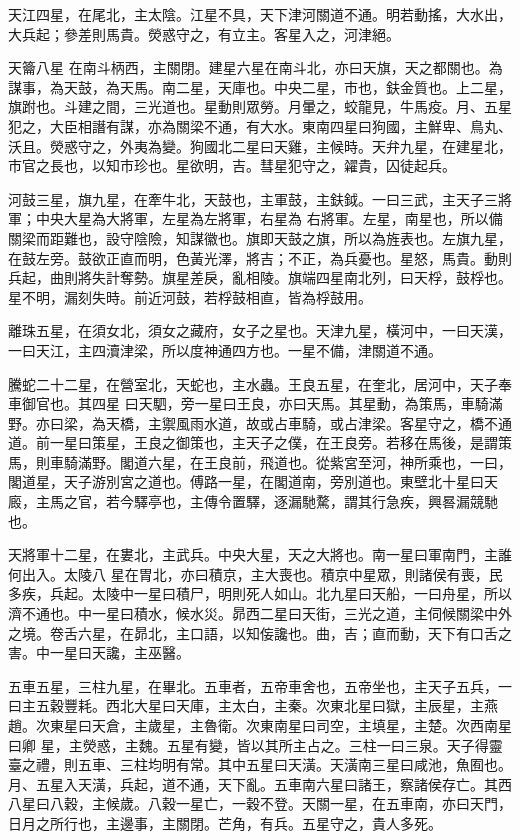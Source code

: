 \begin{pinyinscope}
{{ 天江四星，在尾北，主太陰。江星不具，天下津河關道不通。明若動搖，大水出，大兵起；參差則馬貴。熒惑守之，有立主。客星入之，河津絕。



 天籥八星
 在南斗柄西，主關閉。建星六星在南斗北，亦曰天旗，天之都關也。為謀事，為天鼓，為天馬。南二星，天庫也。中央二星，市也，鈇金質也。上二星，旗跗也。斗建之間，三光道也。星動則眾勞。月暈之，蛟龍見，牛馬疫。月、五星犯之，大臣相譖有謀，亦為關梁不通，有大水。東南四星曰狗國，主鮮卑、鳥丸、沃且。熒惑守之，外夷為變。狗國北二星曰天雞，主候時。天弁九星，在建星北，市官之長也，以知市珍也。星欲明，吉。彗星犯守之，糴貴，囚徒起兵。



 河鼓三星，旗九星，在牽牛北，天鼓也，主軍鼓，主鈇鉞。一曰三武，主天子三將軍；中央大星為大將軍，左星為左將軍，右星為
 右將軍。左星，南星也，所以備關梁而距難也，設守陰險，知謀徽也。旗即天鼓之旗，所以為旌表也。左旗九星，在鼓左旁。鼓欲正直而明，色黃光澤，將吉；不正，為兵憂也。星怒，馬貴。動則兵起，曲則將失計奪勢。旗星差戾，亂相陵。旗端四星南北列，曰天桴，鼓桴也。星不明，漏刻失時。前近河鼓，若桴鼓相直，皆為桴鼓用。



 離珠五星，在須女北，須女之藏府，女子之星也。天津九星，橫河中，一曰天漢，一曰天江，主四瀆津梁，所以度神通四方也。一星不備，津關道不通。



 騰蛇二十二星，在營室北，天蛇也，主水蟲。王良五星，在奎北，居河中，天子奉車御官也。其四星
 曰天駟，旁一星曰王良，亦曰天馬。其星動，為策馬，車騎滿野。亦曰梁，為天橋，主禦風雨水道，故或占車騎，或占津梁。客星守之，橋不通道。前一星曰策星，王良之御策也，主天子之僕，在王良旁。若移在馬後，是謂策馬，則車騎滿野。閣道六星，在王良前，飛道也。從紫宮至河，神所乘也，一曰，閣道星，天子游別宮之道也。傅路一星，在閣道南，旁別道也。東壁北十星曰天廄，主馬之官，若今驛亭也，主傳令置驛，逐漏馳騖，謂其行急疾，興晷漏競馳也。



 天將軍十二星，在婁北，主武兵。中央大星，天之大將也。南一星曰軍南門，主誰何出入。太陵八
 星在胃北，亦曰積京，主大喪也。積京中星眾，則諸侯有喪，民多疾，兵起。太陵中一星曰積尸，明則死人如山。北九星曰天船，一曰舟星，所以濟不通也。中一星曰積水，候水災。昴西二星曰天街，三光之道，主伺候關梁中外之境。卷舌六星，在昴北，主口語，以知侫讒也。曲，吉；直而動，天下有口舌之害。中一星曰天讒，主巫醫。



 五車五星，三柱九星，在畢北。五車者，五帝車舍也，五帝坐也，主天子五兵，一曰主五穀豐耗。西北大星曰天庫，主太白，主秦。次東北星曰獄，主辰星，主燕趙。次東星曰天倉，主歲星，主魯衛。次東南星曰司空，主填星，主楚。次西南星曰卿
 星，主熒惑，主魏。五星有變，皆以其所主占之。三柱一曰三泉。天子得靈臺之禮，則五車、三柱均明有常。其中五星曰天潢。天潢南三星曰咸池，魚囿也。月、五星入天潢，兵起，道不通，天下亂。五車南六星曰諸王，察諸侯存亡。其西八星曰八穀，主候歲。八穀一星亡，一穀不登。天關一星，在五車南，亦曰天門，日月之所行也，主邊事，主關閉。芒角，有兵。五星守之，貴人多死。



}}
\end{pinyinscope}

